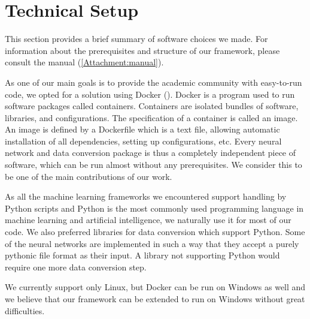 \section{Technical Setup}
This section provides a brief summary of software choices we made. For information about the prerequisites and structure of our framework, please consult the manual (\autoref{Attachment:manual}). \par
As one of our main goals is to provide the academic community with easy-to-run code, we opted for a solution using Docker (\cite{merkel_docker:_2014}). Docker is a program used to run software packages called containers. Containers are isolated bundles of software, libraries, and configurations. The specification of a container is called an image. An image is defined by a Dockerfile which is a text file, allowing automatic installation of all dependencies, setting up configurations, etc. Every neural network and data conversion package is thus a completely independent piece of software, which can be run almost without any prerequisites. We consider this to be one of the main contributions of our work. \par
As all the machine learning frameworks we encountered support handling by Python scripts and Python is the most commonly used programming language in machine learning and artificial intelligence, we naturally use it for most of our code. We also preferred libraries for data conversion which support Python. Some of the neural networks are implemented in such a way that they accept a purely pythonic file format as their input. A library not supporting Python would require one more data conversion step.\par
We currently support only Linux, but Docker can be run on Windows as well and we believe that our framework can be extended to run on Windows without great difficulties. 
